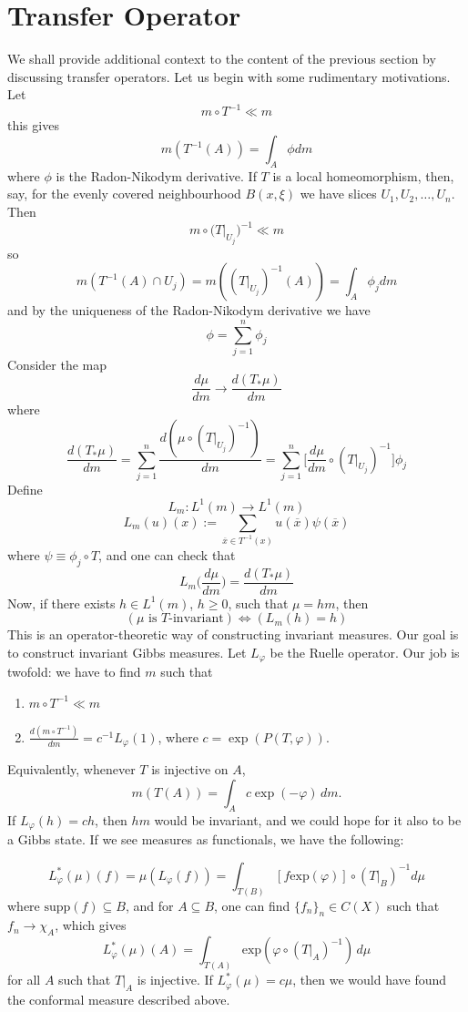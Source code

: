 \documentclass[11pt,a4paper]{article}
\begin{document}
\section{Transfer Operator}
We shall provide additional context to the content of the previous section by
discussing transfer operators. Let us begin with some rudimentary motivations.
Let
$$m\circ T^{-1} \ll m$$
this gives
$$m(T^{-1}(A)) = \int_A \phi dm$$
where $\phi$ is the Radon-Nikodym derivative. If $T$ is a local homeomorphism,
then, say, for the evenly covered neighbourhood $B(x,\xi)$ we have slices
$U_1,U_2,\ldots,U_n$. Then
$$m\circ \bigg(T\big|_{U_j}\bigg)^{-1} \ll m$$
so
$$m(T^{-1}(A)\cap U_j) = m((T|_{U_j})^{-1}(A)) = \int_A \phi_j dm$$
and by the uniqueness of the Radon-Nikodym derivative we have
$$\phi = \sum_{j= 1}^{n} \phi_j$$
Consider the map
$$\frac{d\mu}{dm} \rightarrow \frac{d(T_*\mu)}{dm}$$
where
$$\frac{d(T_*\mu)}{dm} = \sum_{j= 1}^{n} \frac{d(\mu\circ(T|_{U_j})^{-1})}{dm} = \sum_{j=1}^{n}\bigg[\frac{d\mu}{dm}\circ(T|_{U_j})^{-1}\bigg]\phi_j$$
Define
$$L_m: L^1(m) \rightarrow L^1(m)$$
$$L_m(u)(x):= \sum_{\overline{x}\in T^{-1}(x)}u(\overline{x})\psi(\overline{x})$$
where $\psi \equiv \phi_j\circ T$, and one can check that
$$L_m\bigg(\frac{d\mu}{dm}\bigg) = \frac{d(T_*\mu)}{dm}$$
Now, if there exists $h\in L^1(m)$, $h\geq0$, such that $\mu=hm$, then
$$(\mu \text{ is }T\text{-invariant}) \iff (L_m(h) = h)$$
This is an operator-theoretic way of constructing invariant measures. Our
goal is to construct invariant Gibbs measures. Let $L_{\varphi}$ be the Ruelle
operator. Our job is twofold: we have to find $m$ such that
\begin{enumerate}
    \item $m\circ T^{-1} \ll m$
    \item $\frac{d(m\circ T^{-1})}{dm} = c^{-1}L_{\varphi}(1)$, where $c=\exp(P(T,\varphi))$.
\end{enumerate}
Equivalently, whenever $T$ is injective on $A$,
$$m(T(A))=\int_A c\exp(-\varphi)\,dm.$$
If $L_{\varphi}(h)=ch$, then $hm$ would be invariant, and we could hope for it
also to be a Gibbs state. If we see measures as functionals, we have the
following:

$$L_{\varphi}^*(\mu)(f) = \mu(L_{\varphi}(f)) = \int_{T(B)}[f\text{exp}(\varphi)]\circ (T|_B)^{-1}d\mu$$
where $\text{supp}(f) \subseteq B$, and for $A\subseteq B$, one can find $\{f_n\}_n \in C(X)$ such that $f_n \rightarrow \chi_A$, which gives
$$L_{\varphi}^*(\mu)(A) = \int_{T(A)}\text{exp}(\varphi\circ (T|_A)^{-1})\,d\mu$$
for all $A$ such that $T|_A$ is injective. If $L_{\varphi}^*(\mu) = c\mu$, then we would have found the conformal measure described above.
\end{document}
